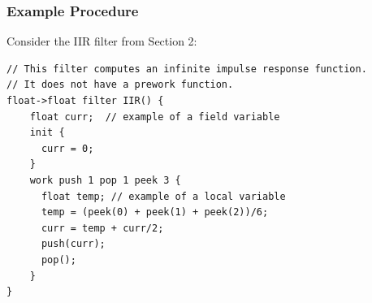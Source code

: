 \subsubsection{Example Procedure}

    Consider the IIR filter from Section 2:

\begin{scriptsize}
\begin{singlespace}
\begin{verbatim}
// This filter computes an infinite impulse response function.
// It does not have a prework function.
float->float filter IIR() {
    float curr;  // example of a field variable
    init {
      curr = 0;
    }
    work push 1 pop 1 peek 3 {
      float temp; // example of a local variable
      temp = (peek(0) + peek(1) + peek(2))/6;
      curr = temp + curr/2;
      push(curr);
      pop();
    }
}
\end{verbatim}
\end{singlespace}
\end{scriptsize}

